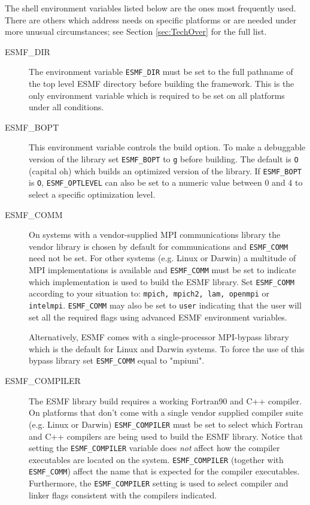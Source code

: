 The shell environment variables listed below are the ones most
frequently used.  There are others which address needs on specific
platforms or are needed under more unusual circumstances; 
see Section \ref{sec:TechOver} for the full list.  
\begin{description}

\item[ESMF\_DIR]
The environment variable {\tt ESMF\_DIR} must be set to the full pathname 
of the top level ESMF directory before building the framework.  This is the 
only environment variable which is required to be set on all platforms under 
all conditions.

\item[ESMF\_BOPT]
This environment variable controls the build option. To make a debuggable
version of the library set {\tt ESMF\_BOPT} to {\tt g} before building. The
default is {\tt O} (capital oh) which builds an optimized version of the 
library. If {\tt ESMF\_BOPT} is {\tt O}, {\tt ESMF\_OPTLEVEL} can also be set
to a numeric value between 0 and 4 to select a specific optimization level.

\item[ESMF\_COMM]
On systems with a vendor-supplied MPI communications library the vendor library 
is chosen by default for communications and {\tt ESMF\_COMM} need not be set.
For other systems (e.g. Linux or Darwin) a multitude of MPI implementations is
available and {\tt ESMF\_COMM} must be set to indicate which implementation is
used to build the ESMF library. Set {\tt ESMF\_COMM} according to your situation
to: {\tt mpich, mpich2, lam, openmpi} or {\tt intelmpi}. {\tt ESMF\_COMM} may
also be set to {\tt user} indicating that the user will set all the required
flags using advanced ESMF environment variables.

Alternatively, ESMF comes with a single-processor MPI-bypass library which is
the default for Linux and Darwin systems. To force the use of this bypass
library set {\tt ESMF\_COMM} equal to "mpiuni".

\item[ESMF\_COMPILER]
The ESMF library build requires a working Fortran90 and C++ compiler. On 
platforms that don't come with a single vendor supplied compiler suite
(e.g. Linux or Darwin) {\tt ESMF\_COMPILER} must be set to select which Fortran
and C++ compilers are being used to build the ESMF library. Notice that setting
the {\tt ESMF\_COMPILER} variable does {\em not} affect how the compiler
executables are located on the system. {\tt ESMF\_COMPILER} (together with
{\tt ESMF\_COMM}) affect the name that is expected for the compiler executables.
Furthermore, the {\tt ESMF\_COMPILER} setting is used to select compiler and
linker flags consistent with the compilers indicated.


\end{description}
